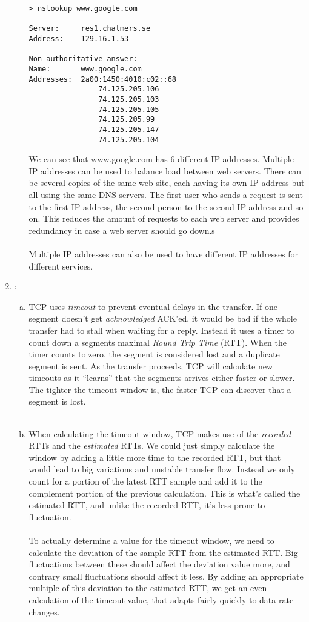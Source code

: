 \documentclass[a4paper,9pt,fleqn]{article}
\begin{document}
\begin{enumerate}[{Task} 1]
\begin{enumerate}[a)]
\begin{lstlisting}
> nslookup www.google.com

Server:  	res1.chalmers.se
Address:  	129.16.1.53

Non-authoritative answer:
Name:    	www.google.com
Addresses:  2a00:1450:4010:c02::68
         		74.125.205.106
         		74.125.205.103
         		74.125.205.105
         		74.125.205.99
         		74.125.205.147
         		74.125.205.104
\end{lstlisting}

We can see that www.google.com has 6 different IP addresses. Multiple IP addresses
can be used to balance load between web servers. There can be several copies of the
same web site, each having its own IP address but all using the same DNS servers. The
first user who sends a request is sent to the first IP address, the second person to
the second IP address and so on. This reduces the amount of requests to each web server
and provides redundancy in case a web server should go down.s
\\
\\
Multiple IP addresses can also be used to have different IP addresses for different services.
\end{enumerate}

\item :
\begin{enumerate}[a)]
\item 
TCP uses {\it timeout} to prevent eventual delays in the transfer. If one segment doesn't get
{\it acknowledged} {ACK'ed}, it would be bad if the whole transfer had to stall when waiting
for a reply. Instead it uses a timer to count down a segments maximal {\it Round Trip Time}
(RTT). When the timer counts to zero, the segment is considered lost and a duplicate segment
is sent. As the transfer proceeds, TCP will calculate new timeouts as it ``learns'' that 
the segments arrives either faster or slower. The tighter the timeout window is, the faster
TCP can discover that a segment is lost.   
\\
\\
\item 
When calculating the timeout window, TCP makes use of the {\it recorded} RTTs and the
{\it estimated} RTTs. We could just simply calculate the window by adding a little more
time to the recorded RTT, but that would lead to big variations and unstable transfer
flow. Instead we only count for a portion of the latest RTT sample and add it to the
complement portion of the previous calculation. This is what's called the estimated
RTT, and unlike the recorded RTT, it's less prone to fluctuation.
\\
\\
To actually determine a value for the timeout window, we need to calculate the deviation
of the sample RTT from the estimated RTT. Big fluctuations between these should affect
the deviation value more, and contrary small fluctuations should affect it less. By adding
an appropriate multiple of this deviation to the estimated RTT, we get an even calculation
of the timeout value, that adapts fairly quickly to data rate changes.  
\end{enumerate}

\end{enumerate}
\end{document}
